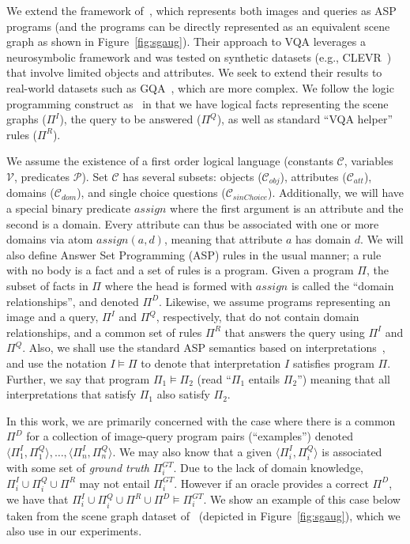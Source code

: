 We extend the framework of~\cite{eiter2022neuro}, which represents both images and queries as ASP programs (and the programs can be directly represented as an equivalent scene graph as shown in Figure~\ref{fig:sgaug}).  Their approach to VQA leverages a neurosymbolic framework and was tested on synthetic datasets (e.g., CLEVR~\cite{johnson2017clevr}) that involve limited objects and attributes.
We seek to extend their results to real-world datasets such as GQA~\cite{hudson2019gqa}, which are more complex. We follow the logic programming construct as~\cite{eiter2022neuro} in that we have logical facts representing the scene graphs ($\Pi^{I}$), the query to be answered ($\Pi^{Q}$), as well as standard ``VQA helper'' rules ($\Pi^{R}$).

We assume the existence of a first order logical language (constants $\mathcal{C}$, variables $\mathcal{V}$, predicates $\mathcal{P}$).  
Set $\mathcal{C}$ has several subsets: objects ($\mathcal{C}_{obj}$), attributes ($\mathcal{C}_{att}$), domains ($\mathcal{C}_{dom}$), and single choice questions ($\mathcal{C}_{sinChoice}$).  Additionally, we will have a special binary predicate $assign$ where the first argument is an attribute and the second is a domain.  
Every attribute can thus be associated with one or more domains via atom $assign(a,d)$, meaning that attribute $a$ has domain $d$. We will also define Answer Set Programming (ASP) rules in the usual manner; a rule with no body is a fact and a set of rules is a program.  Given a program $\Pi$, the subset of facts in $\Pi$ where the head is formed with $assign$ is called the ``domain relationships'', and denoted $\Pi^D$.  
Likewise, we assume programs representing an image and a query, $\Pi^I$ and $\Pi^Q$, respectively, that do not contain domain relationships, and a common set of rules $\Pi^R$ that answers the query using $\Pi^I$ and $\Pi^Q$.  
Also, we shall use the standard ASP semantics based on interpretations~\cite{eiter2022neuro}, and use the notation $I \models \Pi$ to denote that interpretation $I$ satisfies program $\Pi$.  
Further, we say that program $\Pi_1 \models \Pi_2$ (read ``$\Pi_1$ entails $\Pi_2$'') meaning that all interpretations that satisfy $\Pi_1$ also satisfy $\Pi_2$.

In this work, we are primarily concerned with the case where there is a common $\Pi^D$ for a collection of image-query program pairs (``examples'') denoted 
$\langle\Pi^{I}_1, \Pi^Q_1\rangle, \ldots, \langle\Pi^{I}_n, \Pi^Q_n\rangle$.  
We may also know that a given $\langle\Pi^{I}_i,\Pi^Q_i\rangle$ is associated with some set of {\em ground truth} $\Pi^{GT}_i$. Due to the lack of domain knowledge, $\Pi^{I}_i\cup\Pi^Q_i\cup\Pi^{R}$ may not entail $\Pi^{GT}_i$. 
However if an oracle provides a correct $\Pi^D$, we have that $\Pi^{I}_i\cup\Pi^{Q}_i \cup \Pi^{R} \cup \Pi^{D} \models \Pi^{GT}_i$. 
We show an example of this case below taken from the scene graph dataset of~\cite{hudson2019gqa} (depicted in Figure~\ref{fig:sgaug}), which we also use in our experiments.


